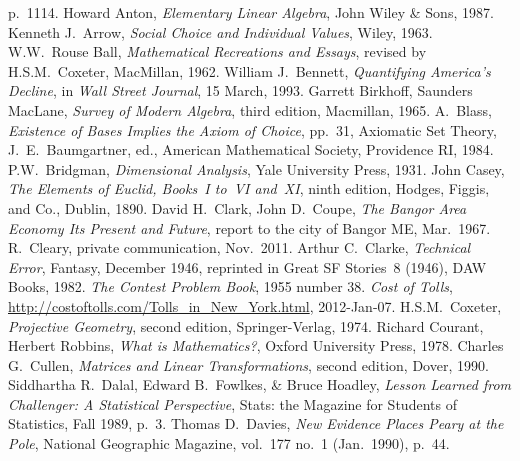 \begin{thebibliography}{\makebox[2em][c]{{}\hfil{}}}
  p.~1114.
  Howard Anton,
  \emph{Elementary Linear Algebra},
  John Wiley \& Sons,
  1987.
  Kenneth J.~Arrow,
  \emph{Social Choice and Individual Values},
  Wiley,
  1963.
 W.W.~Rouse Ball,
 \emph{Mathematical Recreations and Essays},
 revised by H.S.M.~Coxeter,
 MacMillan,
 1962.
  William J.~Bennett,
  \emph{Quantifying America's Decline},
  in
  \emph{Wall Street Journal},
  15 March, 1993.
  Garrett Birkhoff, Saunders MacLane,
  \emph{Survey of Modern Algebra},
  third edition,
  Macmillan, 
  1965.
  A.~Blass,
  \emph{Existence of Bases Implies the Axiom of Choice},
  pp.\ 31,
  Axiomatic Set Theory, J.\ E.\ Baumgartner, ed.,
  American Mathematical Society,
  Providence RI, 1984.
  P.W.~Bridgman,
  \emph{Dimensional Analysis},
  Yale University Press,
  1931.
  John Casey,
  \emph{The Elements of Euclid, Books~I to~VI and~XI},
  ninth edition,
  Hodges, Figgis, and Co.,
  Dublin,
  1890.
  David H.\ Clark, John D.\ Coupe,
  \emph{The Bangor Area Economy Its Present and Future},
  report to the city of Bangor ME,
  Mar.\ 1967.
  R.~Cleary,
  private communication,
  Nov.\ 2011.
  Arthur C.~Clarke,
  \emph{Technical Error},
  Fantasy, December 1946,
  reprinted in
  Great SF Stories~8 (1946),
  DAW Books, 1982. 
  \emph{The Contest Problem Book},
  1955 number 38.
  \emph{Cost of Tolls},
  \url{http://costoftolls.com/Tolls_in_New_York.html},
  2012-Jan-07.
  H.S.M.~Coxeter,
  \emph{Projective Geometry},
  second edition,
  Springer-Verlag, 1974.
  Richard Courant, Herbert Robbins,
  \emph{What is Mathematics?},
  Oxford University Press, 1978.
  Charles G.\ Cullen,
  \emph{Matrices and Linear Transformations},
  second edition,
  Dover,
  1990.
  Siddhartha R.~Dalal, Edward B.~Fowlkes, \& Bruce Hoadley,
  \emph{Lesson Learned from Challenger: A Statistical Perspective},
  Stats: the Magazine for Students of Statistics,
  Fall 1989,
  p.~3.
  Thomas D.~Davies,
  \emph{New Evidence Places Peary at the Pole},
  National Geographic Magazine,
  vol.~177 no.~1 (Jan.~1990),
  p.~44.

\end{thebibliography}
